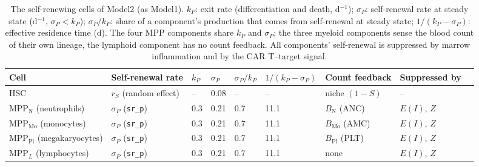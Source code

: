 \begin{table}[!htbp]
\centering
\footnotesize
\setlength{\tabcolsep}{3.5pt}
\caption{The self-renewing cells of Model2 (as Model1). $k_P$: exit rate (differentiation and death, d$^{-1}$); $\sigma_P$: self-renewal rate at steady state (d$^{-1}$, $\sigma_P<k_P$); $\sigma_P/k_P$: share of a component's production that comes from self-renewal at steady state; $1/(k_P-\sigma_P)$: effective residence time (d). The four MPP components share $k_P$ and $\sigma_P$; the three myeloid components sense the blood count of their own lineage, the lymphoid component has no count feedback. All components' self-renewal is suppressed by marrow inflammation and by the CAR T--target signal.}
\label{tab:selfrenewal}
\begin{tabular}{lllllll>{\raggedright\arraybackslash}p{2.2cm}l}
\toprule
Cell & Self-renewal rate & $k_P$ & $\sigma_P$ & $\sigma_P/k_P$ & $1/(k_P-\sigma_P)$ & Count feedback & Suppressed by \\
\midrule
HSC & $r_S$ (random effect) & -- & 0.08 & -- & -- & niche $(1-S)$ & -- \\
MPP$_{\mathrm{N}}$ (neutrophils) & $\sigma_P$ (\texttt{sr\_p}) & 0.3 & 0.21 & 0.7 & 11.1 & $B_{\mathrm{N}}$ (ANC) & $E(I)$, $Z$ \\
MPP$_{\mathrm{Mo}}$ (monocytes) & $\sigma_P$ (\texttt{sr\_p}) & 0.3 & 0.21 & 0.7 & 11.1 & $B_{\mathrm{Mo}}$ (AMC) & $E(I)$, $Z$ \\
MPP$_{\mathrm{Pl}}$ (megakaryocytes) & $\sigma_P$ (\texttt{sr\_p}) & 0.3 & 0.21 & 0.7 & 11.1 & $B_{\mathrm{Pl}}$ (PLT) & $E(I)$, $Z$ \\
MPP$_{L}$ (lymphocytes) & $\sigma_P$ (\texttt{sr\_p}) & 0.3 & 0.21 & 0.7 & 11.1 & none & $E(I)$, $Z$ \\
\bottomrule
\end{tabular}
\end{table}

